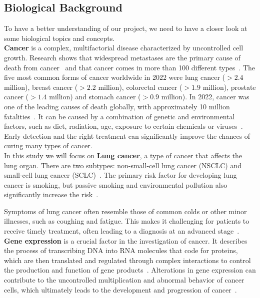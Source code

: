 \subsection{Biological Background} \label{subsec:biological_background}
To have a better understanding of our project, we need to have a closer look at some biological topics and concepts.\\

\textbf{Cancer} is a complex, multifactorial disease characterized by uncontrolled cell growth.
Research shows that widespread metastases are the primary cause of death from cancer~\cite{who_cancer_fact_sheet}
and that cancer comes in more than 100 different types~\cite{nci_cancer_types}.
The five most common forms of cancer worldwide in 2022 were lung cancer ($>2.4$ million),
breast cancer ($>2.2$ million), colorectal cancer ($>1.9$ million), prostate cancer ($>1.4$ million) and
stomach cancer ($>0.9$ million).
In 2022, cancer was one of the leading causes of death globally,
with approximately 10 million fatalities~\cite{ferlay2024global}.
It can be caused by a combination of genetic and environmental factors,
such as diet, radiation, age, exposure to certain chemicals or viruses~\cite{nci_cancer_risk}.
Early detection and the right treatment can significantly improve the chances of curing many types of cancer.
\\

In this study we will focus on \textbf{Lung cancer}, a type of cancer that affects the lung organ.
There are two subtypes: non-small-cell lung cancer (NSCLC) and small-cell lung cancer (SCLC)~\cite{nci_lung_cancer_types}.
The primary risk factor for developing lung cancer is smoking,
but passive smoking and environmental pollution also significantly increase the risk~\cite{nci_lung_cancer_types}.

Symptoms of lung cancer often resemble those of common colds or other minor illnesses, such as coughing and fatigue.
This makes it challenging for patients to receive timely treatment, often leading to a diagnosis at an advanced stage~\cite{who_lung_cancer}.
\\

\textbf{Gene expression} is a crucial factor in the investigation of cancer.
It describes the process of transcribing DNA into RNA molecules that code for proteins,
which are then translated and regulated through complex interactions to control the production
and function of gene products~\cite{nhi_gene_expression}.
Alterations in gene expression can contribute to the uncontrolled multiplication and abnormal behavior of cancer cells,
which ultimately leads to the development and progression of cancer~\cite{ferlier2022regulation}.
\\


